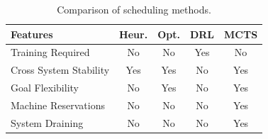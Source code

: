 \documentclass[conference]{IEEEtran}
\begin{document}


\begin{table}[h]
\centering
\small %
\setlength{\tabcolsep}{3pt} %
\begin{tabular}{|p{3cm}|c|c|c|c|} 
 \hline
 \textbf{Features} & \textbf{Heur.} & \textbf{Opt.} & \textbf{DRL} & \textbf{MCTS} \\
 \hline
 Training Required & No & No & Yes & No \\
 \hline
 Cross System Stability & Yes & Yes & No & Yes \\
 \hline
 Goal Flexibility & No & Yes & No & Yes \\
 \hline
 Machine 
 Reservations & No & No & No & Yes \\
 \hline
 System Draining & No & No & No & Yes \\
 \hline
\end{tabular}
\caption{Comparison of scheduling methods.}
\label{tab:scheduling-comparison}
\end{table}
\end{document}

